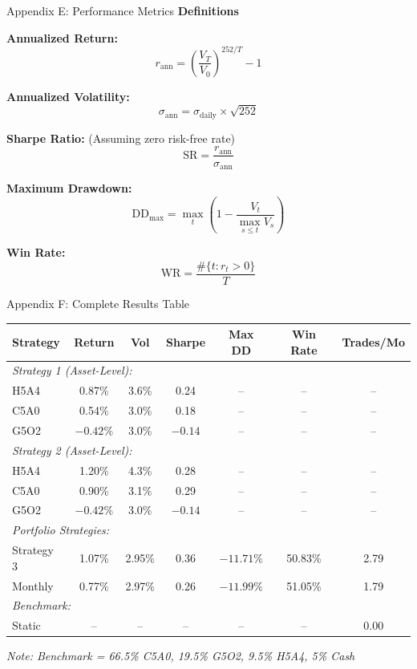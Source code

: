 \documentclass[aspectratio=169,10pt]{beamer}
\begin{document}
\begin{frame}{Appendix E: Performance Metrics}
\textbf{Definitions}

\vspace{0.2cm}

\textbf{Annualized Return:}
$$r_{\text{ann}} = \left(\frac{V_T}{V_0}\right)^{252/T} - 1$$

\vspace{0.1cm}

\textbf{Annualized Volatility:}
$$\sigma_{\text{ann}} = \sigma_{\text{daily}} \times \sqrt{252}$$

\vspace{0.1cm}

\textbf{Sharpe Ratio:} (Assuming zero risk-free rate)
$$\text{SR} = \frac{r_{\text{ann}}}{\sigma_{\text{ann}}}$$

\vspace{0.1cm}

\textbf{Maximum Drawdown:}
$$\text{DD}_{\text{max}} = \max_{t} \left(1 - \frac{V_t}{\max_{s \leq t} V_s}\right)$$

\vspace{0.1cm}

\textbf{Win Rate:}
$$\text{WR} = \frac{\#\{t : r_t > 0\}}{T}$$
\end{frame}

\begin{frame}{Appendix F: Complete Results Table}
\small
\begin{center}
\begin{tabular}{lcccccc}
\toprule
\textbf{Strategy} & \textbf{Return} & \textbf{Vol} & \textbf{Sharpe} & \textbf{Max DD} & \textbf{Win Rate} & \textbf{Trades/Mo} \\
\midrule
\multicolumn{7}{l}{\textit{Strategy 1 (Asset-Level):}} \\
H5A4 & 0.87\% & 3.6\% & 0.24 & -- & -- & -- \\
C5A0 & 0.54\% & 3.0\% & 0.18 & -- & -- & -- \\
G5O2 & $-0.42\%$ & 3.0\% & $-0.14$ & -- & -- & -- \\
\midrule
\multicolumn{7}{l}{\textit{Strategy 2 (Asset-Level):}} \\
H5A4 & 1.20\% & 4.3\% & 0.28 & -- & -- & -- \\
C5A0 & 0.90\% & 3.1\% & 0.29 & -- & -- & -- \\
G5O2 & $-0.42\%$ & 3.0\% & $-0.14$ & -- & -- & -- \\
\midrule
\multicolumn{7}{l}{\textit{Portfolio Strategies:}} \\
Strategy 3 & 1.07\% & 2.95\% & 0.36 & $-11.71\%$ & 50.83\% & 2.79 \\
Monthly & 0.77\% & 2.97\% & 0.26 & $-11.99\%$ & 51.05\% & 1.79 \\
\midrule
\multicolumn{7}{l}{\textit{Benchmark:}} \\
Static & -- & -- & -- & -- & -- & 0.00 \\
\bottomrule
\end{tabular}
\end{center}

\vspace{0.2cm}
\textit{Note: Benchmark = 66.5\% C5A0, 19.5\% G5O2, 9.5\% H5A4, 5\% Cash}
\end{frame}
\end{document}
